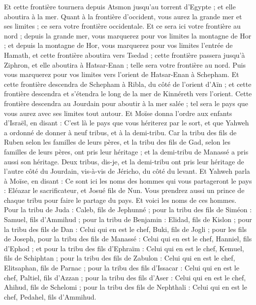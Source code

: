 \begin{multicols}{2}
Et cette frontière tournera depuis Atsmon jusqu'au torrent d'Egypte ; et elle aboutira à la mer.
Quant à la frontière d'occident, vous aurez la grande mer et ses limites ; ce sera votre frontière occidentale.
Et ce sera ici votre frontière au nord ; depuis la grande mer, vous marquerez pour vos limites la montagne de Hor ;
et depuis la montagne de Hor, vous marquerez pour vos limites l'entrée de Hamath, et cette frontière aboutira vers Tsedad ;
cette frontière passera jusqu'à Ziphron, et elle aboutira à Hatsar-Enan ; telle sera votre frontière au nord.
Puis vous marquerez pour vos limites vers l'orient de Hatsar-Enan à Schepham.
Et cette frontière descendra de Schepham à Ribla, du côté de l'orient d'Aïn ; et cette frontière descendra et s'étendra le long de la mer de Kinnéreth vers l'orient.
Cette frontière descendra au Jourdain pour aboutir à la mer salée ; tel sera le pays que vous aurez avec ses limites tout autour.
Et Moïse donna l'ordre aux enfants d'Israël, en disant : C'est là le pays que vous hériterez par le sort, et que Yahweh a ordonné de donner à neuf tribus, et à la demi-tribu.
Car la tribu des fils de Ruben selon les familles de leurs pères, et la tribu des fils de Gad, selon les familles de leurs pères, ont pris leur héritage ; et la demi-tribu de Manassé a pris aussi son héritage.
Deux tribus, dis-je, et la demi-tribu ont pris leur héritage de l'autre côté du Jourdain, vis-à-vis de Jéricho, du côté du levant.
Et Yahweh parla à Moïse, en disant :
Ce sont ici les noms des hommes qui vous partageront le pays : Eléazar le sacrificateur, et Josué fils de Nun.
Vous prendrez aussi un prince de chaque tribu pour faire le partage du pays.
Et voici les noms de ces hommes. Pour la tribu de Juda : Caleb, fils de Jephunné ;
pour la tribu des fils de Siméon : Samuel, fils d'Ammihud ;
pour la tribu de Benjamin : Elidad, fils de Kislon ;
pour la tribu des fils de Dan : Celui qui en est le chef, Buki, fils de Jogli ;
pour les fils de Joseph, pour la tribu des fils de Manassé : Celui qui en est le chef, Hanniel, fils d'Ephod ;
et pour la tribu des fils d'Ephraïm : Celui qui en est le chef, Kemuel, fils de Schiphtan ;
pour la tribu des fils de Zabulon : Celui qui en est le chef, Elitsaphan, fils de Parnac ;
pour la tribu des fils d'Issacar : Celui qui en est le chef, Paltiel, fils d'Azzan ;
pour la tribu des fils d'Aser : Celui qui en est le chef, Ahihud, fils de Schelomi ;
pour la tribu des fils de Nephthali : Celui qui en est le chef, Pedahel, fils d'Ammihud.

\end{multicols}
